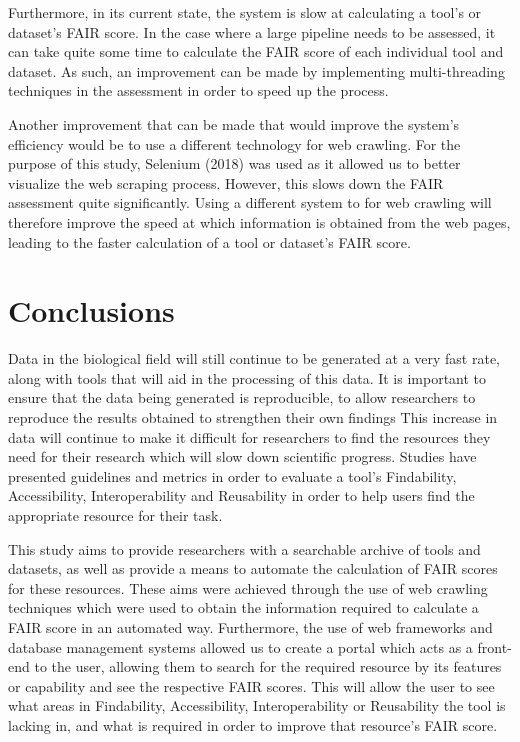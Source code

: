 \documentclass{cisfyp}
\begin{document}
Furthermore, in its current state, the system is slow at calculating a tool's or dataset's FAIR score. In the case where a large pipeline needs to be assessed, it can take quite some time to calculate the FAIR score of each individual tool and dataset. As such, an improvement can be made by implementing multi-threading techniques in the assessment in order to speed up the process.\newline

Another improvement that can be made that would improve the system's efficiency would be to use a different technology for web crawling. For the purpose of this study, Selenium (2018) was used as it allowed us to better visualize the web scraping process. However, this slows down the FAIR assessment quite significantly. Using a different system to for web crawling will therefore improve the speed at which information is obtained from the web pages, leading to the faster calculation of a tool or dataset's FAIR score.

\chapter{Conclusions}
Data in the biological field will still continue to be generated at a very fast rate, along with tools that will aid in the processing of this data. It is important to ensure that the data being generated is reproducible, to allow researchers to reproduce the results obtained to strengthen their own findings \cite{nature} This increase in data will continue to make it difficult for researchers to find the resources they need for their research which will slow down scientific progress. Studies have presented guidelines and metrics in order to evaluate a tool's Findability, Accessibility, Interoperability and Reusability in order to help users find the appropriate resource  for their task. 

This study aims to provide researchers with a searchable archive of tools and datasets, as well as provide a means to automate the calculation of FAIR scores for these resources. These aims were achieved through the use of web crawling techniques which were used to obtain the information required to calculate a FAIR score in an automated way. Furthermore, the use of web frameworks and database management systems allowed us to create a portal which acts as a front-end to the user, allowing them to search for the required resource by its features or capability and see the respective FAIR scores. This will allow the user to see what areas in Findability, Accessibility, Interoperability or Reusability the tool is lacking in, and what is required in order to improve that resource's FAIR score.
\end{document}
